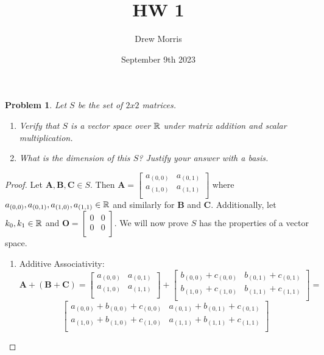 \documentclass[12pt,oneside]{amsart}
\title{HW 1}
\author{Drew Morris}
\date{September 9th 2023}
\numberwithin{equation}{section}
\numberwithin{figure}{section}
\theoremstyle{plain}
\newtheorem{prob}{Problem}
\theoremstyle{definition}
\newcommand{\R}{\ensuremath \mathbb{R}}
\begin{document}
\maketitle

\begin{prob}
Let $S$ be the set of $2x2$ matrices.
\begin{enumerate}
  \item Verify that $S$ is a vector space over $\R$ under matrix addition and 
    scalar multiplication.
  \item What is the dimension of this $S$? Justify your answer with a basis.
\end{enumerate}
\end{prob}
\begin{proof}
  Let $\mathbf{A},\mathbf{B},\mathbf{C} \in S$. Then $\mathbf{A} = 
  \begin{bmatrix} 
    a_{(0,0)} & a_{(0,1)} \\
    a_{(1,0)} & a_{(1,1)} \\
  \end{bmatrix}$ where $a_{(0,0)}, a_{(0,1)}, a_{(1,0)}, a_{(1,1)} \in \R$ and similarly 
  for $\mathbf{B}$ and $\mathbf{C}$. Additionally, let $k_0,k_1 \in \R$ and 
  $\mathbf{O} = \begin{bmatrix}
    0 & 0 \\
    0 & 0 \\
  \end{bmatrix}$. We will now prove $S$ has the 
  properties of a vector space.
  \begin{enumerate}
    \item Additive Associativity: \[\mathbf{A} + (\mathbf{B} + \mathbf{C}) = 
      \begin{bmatrix}
        a_{(0,0)} & a_{(0,1)} \\
        a_{(1,0)} & a_{(1,1)} \\
      \end{bmatrix} + \begin{bmatrix}
        b_{(0,0)} + c_{(0,0)} & b_{(0,1)} + c_{(0,1)} \\
        b_{(1,0)} + c_{(1,0)} & b_{(1,1)} + c_{(1,1)} \\
        \end{bmatrix} = \] \[\begin{bmatrix}
        a_{(0,0)} + b_{(0,0)} + c_{(0,0)} & a_{(0,1)} + b_{(0,1)} + c_{(0,1)} \\
        a_{(1,0)} + b_{(1,0)} + c_{(1,0)} & a_{(1,1)} + b_{(1,1)} + c_{(1,1)} \\

\end{bmatrix}\]
\end{enumerate}
\end{proof}
\end{document}

